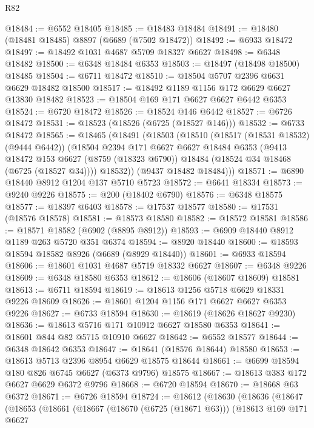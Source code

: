 \begin{lexlean}{R82}
\begin{coremodule}
@18484 := @6552 @18405
@18485 := @18483 @18484
@18491 := @18480 (@18481 @18485) @8897 (@6689 (@7502 @18472))
@18492 := @6933 @18472
@18497 := @18492 @1031 @4687 @5709 @18327 @6627
@18498 := @6348 @18482
@18500 := @6348 @18484 @6353
@18503 := @18497 (@18498 @18500) @18485
@18504 := @6711 @18472
@18510 := @18504 @5707 @2396 @6631 @6629 @18482 @18500
@18517 := @18492 @1189 @1156 @172 @6629 @6627 @13830 @18482
@18523 := @18504 @169 @171 @6627 @6627 @6442 @6353
@18524 := @6720 @18472
@18526 := @18524 @146 @6442
@18527 := @6726 @18472
@18531 := @18523 (@18526 (@6725 (@18527 @146)))
@18532 := @6733 @18472
@18565 := @18465
    (@18491
      (@18503
        (@18510
          (@18517 (@18531 @18532) (@9444 @6442))
          (@18504
            @2394
            @171
            @6627
            @6627
            @18484
            @6353
            (@9413
              @18472
              @153
              @6627
              (@8759 (@18323 @6790))
              @18484
              (@18524 @34 @18468 (@6725 (@18527 @34))))
            @18532))
        (@9437 @18482 @18484)))
@18571 := @6890 @18440 @8912 @1204 @137 @5710 @5723
@18572 := @6641 @18334
@18573 := @9240 @9226
@18575 := @200 (@18402 @6790)
@18576 := @6348 @18575
@18577 := @18397 @6403
@18578 := @17537 @18577
@18580 := @17531 (@18576 @18578)
@18581 := @18573 @18580
@18582 := @18572 @18581
@18586 := @18571 @18582 (@6902 (@8895 @8912))
@18593 := @6909 @18440 @8912 @1189 @263 @5720 @351 @6374
@18594 := @8920 @18440
@18600 := @18593 @18594 @18582 @8926 (@6689 (@8929 @18440))
@18601 := @6933 @18594
@18606 := @18601 @1031 @4687 @5719 @18332 @6627
@18607 := @6348 @9226
@18609 := @6348 @18580 @6353
@18612 := @18606 (@18607 @18609) @18581
@18613 := @6711 @18594
@18619 := @18613 @1256 @5718 @6629 @18331 @9226 @18609
@18626 := @18601 @1204 @1156 @171 @6627 @6627 @6353 @9226
@18627 := @6733 @18594
@18630 := @18619 (@18626 @18627 @9230)
@18636 := @18613 @5716 @171 @10912 @6627 @18580 @6353
@18641 := @18601 @844 @82 @5715 @10910 @6627
@18642 := @6552 @18577
@18644 := @6348 @18642 @6353
@18647 := @18641 (@18576 @18644) @18580
@18653 := @18613 @5713 @2396 @8954 @6629 @18575 @18644
@18661 := @6699 @18594 @180 @826 @6745 @6627 (@6373 @9796) @18575
@18667 := @18613 @383 @172 @6627 @6629 @6372 @9796
@18668 := @6720 @18594
@18670 := @18668 @63 @6372
@18671 := @6726 @18594
@18724 := @18612
    (@18630
      (@18636
        (@18647
          (@18653
            (@18661
              (@18667
                (@18670 (@6725 (@18671 @63)))
                (@18613
                  @169
                  @171
                  @6627

\end{coremodule}
\end{lexlean}
